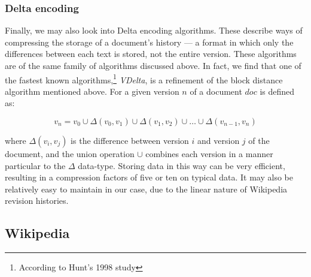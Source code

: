 \documentclass[a4paper,11pt,twoside,notitlepage]{article}
\begin{document}
        \subsubsection*{Delta encoding}
        Finally, we may also look into Delta encoding algorithms. These
        describe ways of compressing the storage of a document's
        history --- a format in which only the differences
        between each text is stored, not the entire version. These
        algorithms are of the same family of algorithms discussed
        above. In fact, we find that one of the fastest known
        algorithms,\footnote{According to Hunt's 1998
          study\cite{Hunt1998}} \textit{VDelta}, is a refinement of
        the block distance algorithm mentioned above. For a given
        version $n$ of a document $doc$ is defined as:
        
        $$v_n = v_0 \cup {\Delta}(v_0,v_1) \cup {\Delta}(v_1,v_2)
        \cup \dots \cup {\Delta}(v_{n-1},v_n) $$

        where ${\Delta}(v_i,v_j)$ is the difference between version
        $i$ and version $j$ of the document, and the union operation
        $\cup$ combines each version in a manner particular to the
        $\Delta$ data-type. Storing data in this way can be very
        efficient, resulting in a compression factors of five or ten
        on typical data.\cite{Macdonald2000} It may also be relatively
        easy to maintain in our case, due to the linear nature of
        Wikipedia revision histories.

        \subsection{Wikipedia}
\end{document}
